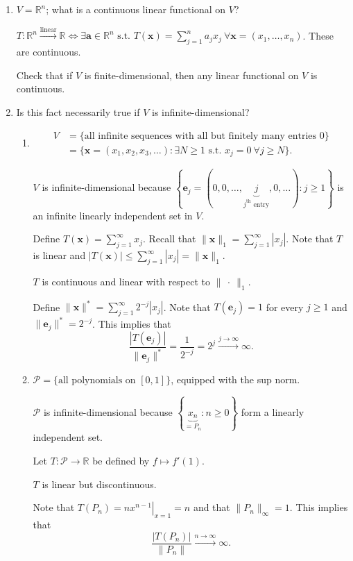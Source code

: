 \documentclass[letterpaper, reqno,11pt]{article}
\newcommand{\RR}{\mathbb{R}}
\begin{document}
\begin{enumerate}
\item $V = \RR^n$; what is a continuous linear functional on $V$?

  $T : \RR^n \xrightarrow{\text{linear}} \RR \Leftrightarrow \exists \mathbf a \in \RR^n \text{ s.t. } T(\mathbf x) = \sum_{j = 1}^n a_j x_j ~ \forall \mathbf x = (x_1, \ldots, x_n)$. These are continuous.

  \medskip

   Check that if $V$ is finite-dimensional, then any linear functional on $V$ is continuous.
\item Is this fact necessarily true if $V$ is infinite-dimensional?
  \begin{enumerate}
  \item
    \begin{align*}
      V &= \{ \text{all infinite sequences with all but finitely many entries $0$} \} \\
      &= \{ \mathbf x = (x_1, x_2, x_3, \ldots) : \exists N \geq 1 \text{ s.t. } x_j = 0 ~ \forall j \geq N \}.
    \end{align*}

    $V$ is infinite-dimensional because $\left\{ \mathbf e_j = (0, 0, \ldots, \underbrace{j}_\text{$j^\text{th}$ entry}, 0, \ldots) : j \geq 1 \right\}$ is an infinite linearly independent set in $V$.

    Define $T(\mathbf x) = \sum_{j = 1}^\infty x_j$. Recall that $\lVert \mathbf x \rVert_1 = \sum_{j = 1}^\infty |x_j|$. Note that $T$ is linear and $|T(\mathbf x)| \leq \sum_{j = 1}^\infty |x_j| = \lVert \mathbf x \rVert_1$.

    \begin{claim}
      \normalfont $T$ is continuous and linear with respect to $\lVert \ \cdot \ \rVert_1$.
    \end{claim}

    Define $\lVert \mathbf x \rVert^* = \sum_{j = 1}^\infty 2^{-j} |x_j|$. Note that $T(\mathbf e_j) = 1$ for every $j \geq 1$ and $\lVert \mathbf e_j \rVert^* = 2^{-j}$. This implies that
    $$ \frac{|T(\mathbf e_j)|}{\lVert \mathbf e_j \rVert^*} = \frac{1}{2^{-j}} = 2^j \xrightarrow{j \to \infty} \infty. $$
  \item $\mathcal P = \{ \text{all polynomials on $[0, 1]$} \}$, equipped with the sup norm.

    $\mathcal P$ is infinite-dimensional because $\left\{ \underbrace{x_n}_{= P_n} : n \geq 0 \right\}$ form a linearly independent set.

    Let $T : \mathcal P \to \RR$ be defined by $f \mapsto f'(1)$.

    \begin{claim}
      \normalfont $T$ is linear but discontinuous.
    \end{claim}

    Note that $T(P_n) = \left. nx^{n - 1} \right|_{x = 1} = n$ and that $\lVert P_n \rVert_\infty = 1$. This implies that
    $$ \frac{|T(P_n)|}{\lVert P_n \rVert} \xrightarrow{n \to \infty} \infty. $$
  \end{enumerate}
\end{enumerate}
\end{document}
